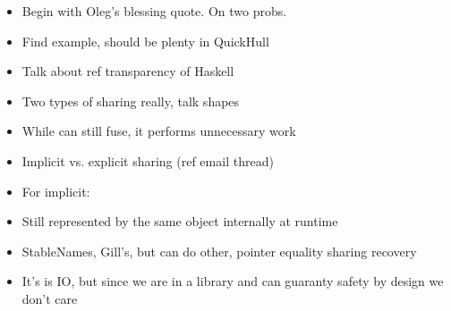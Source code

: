 \documentclass[preamble.tex]{subfiles}
\begin{document}
\begin{itemize}
\item Begin with Oleg's blessing quote. On two probs.
\item Find example, should be plenty in QuickHull
\item Talk about ref transparency of Haskell
\item Two types of sharing really, talk shapes
\item While can still fuse, it performs unnecessary work
\item Implicit vs. explicit sharing (ref email thread)
\item For implicit:
\item Still represented by the same object internally at runtime
\item StableNames, Gill's, but can do other, pointer equality sharing recovery
\item It's is IO, but since we are in a library and can guaranty safety by design we don't care
\end{itemize}

\maybebib
\end{document}
